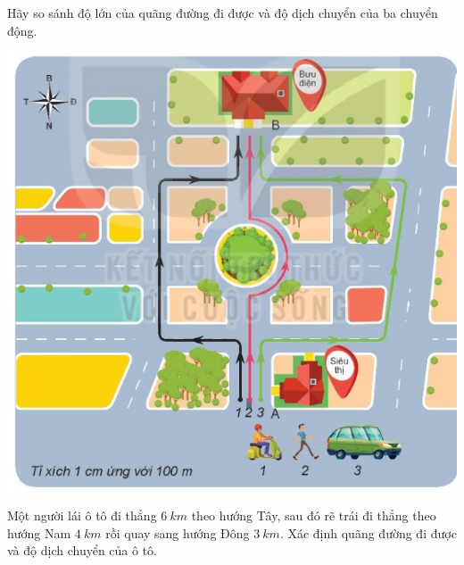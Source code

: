 \begin{ex}
	Hãy so sánh độ lớn của quãng đường đi được và độ dịch chuyển của ba chuyển động. 
	
	\begin{center}
		\includegraphics[scale=0.8]{figs/G10Y25B3-11}
	\end{center}
\end{ex}


\begin{ex}
	Một người lái ô tô đi thẳng $\SI{6}{km}$ theo hướng Tây, sau đó rẽ trái đi thẳng theo hướng Nam $\SI{4}{km}$ rồi quay sang hướng Đông $\SI{3}{km}$. Xác định quãng đường đi được và độ dịch chuyển của ô tô.
\end{ex}

